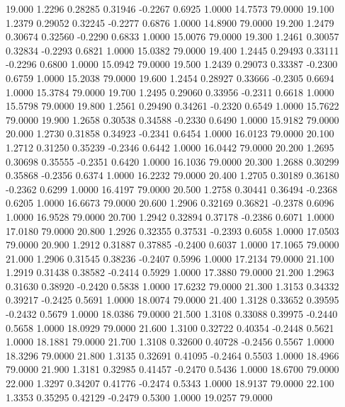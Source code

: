   19.000   1.2296   0.28285   0.31946  -0.2267   0.6925   1.0000  14.7573  79.0000
  19.100   1.2379   0.29052   0.32245  -0.2277   0.6876   1.0000  14.8900  79.0000
  19.200   1.2479   0.30674   0.32560  -0.2290   0.6833   1.0000  15.0076  79.0000
  19.300   1.2461   0.30057   0.32834  -0.2293   0.6821   1.0000  15.0382  79.0000
  19.400   1.2445   0.29493   0.33111  -0.2296   0.6800   1.0000  15.0942  79.0000
  19.500   1.2439   0.29073   0.33387  -0.2300   0.6759   1.0000  15.2038  79.0000
  19.600   1.2454   0.28927   0.33666  -0.2305   0.6694   1.0000  15.3784  79.0000
  19.700   1.2495   0.29060   0.33956  -0.2311   0.6618   1.0000  15.5798  79.0000
  19.800   1.2561   0.29490   0.34261  -0.2320   0.6549   1.0000  15.7622  79.0000
  19.900   1.2658   0.30538   0.34588  -0.2330   0.6490   1.0000  15.9182  79.0000
  20.000   1.2730   0.31858   0.34923  -0.2341   0.6454   1.0000  16.0123  79.0000
  20.100   1.2712   0.31250   0.35239  -0.2346   0.6442   1.0000  16.0442  79.0000
  20.200   1.2695   0.30698   0.35555  -0.2351   0.6420   1.0000  16.1036  79.0000
  20.300   1.2688   0.30299   0.35868  -0.2356   0.6374   1.0000  16.2232  79.0000
  20.400   1.2705   0.30189   0.36180  -0.2362   0.6299   1.0000  16.4197  79.0000
  20.500   1.2758   0.30441   0.36494  -0.2368   0.6205   1.0000  16.6673  79.0000
  20.600   1.2906   0.32169   0.36821  -0.2378   0.6096   1.0000  16.9528  79.0000
  20.700   1.2942   0.32894   0.37178  -0.2386   0.6071   1.0000  17.0180  79.0000
  20.800   1.2926   0.32355   0.37531  -0.2393   0.6058   1.0000  17.0503  79.0000
  20.900   1.2912   0.31887   0.37885  -0.2400   0.6037   1.0000  17.1065  79.0000
  21.000   1.2906   0.31545   0.38236  -0.2407   0.5996   1.0000  17.2134  79.0000
  21.100   1.2919   0.31438   0.38582  -0.2414   0.5929   1.0000  17.3880  79.0000
  21.200   1.2963   0.31630   0.38920  -0.2420   0.5838   1.0000  17.6232  79.0000
  21.300   1.3153   0.34332   0.39217  -0.2425   0.5691   1.0000  18.0074  79.0000
  21.400   1.3128   0.33652   0.39595  -0.2432   0.5679   1.0000  18.0386  79.0000
  21.500   1.3108   0.33088   0.39975  -0.2440   0.5658   1.0000  18.0929  79.0000
  21.600   1.3100   0.32722   0.40354  -0.2448   0.5621   1.0000  18.1881  79.0000
  21.700   1.3108   0.32600   0.40728  -0.2456   0.5567   1.0000  18.3296  79.0000
  21.800   1.3135   0.32691   0.41095  -0.2464   0.5503   1.0000  18.4966  79.0000
  21.900   1.3181   0.32985   0.41457  -0.2470   0.5436   1.0000  18.6700  79.0000
  22.000   1.3297   0.34207   0.41776  -0.2474   0.5343   1.0000  18.9137  79.0000
  22.100   1.3353   0.35295   0.42129  -0.2479   0.5300   1.0000  19.0257  79.0000
